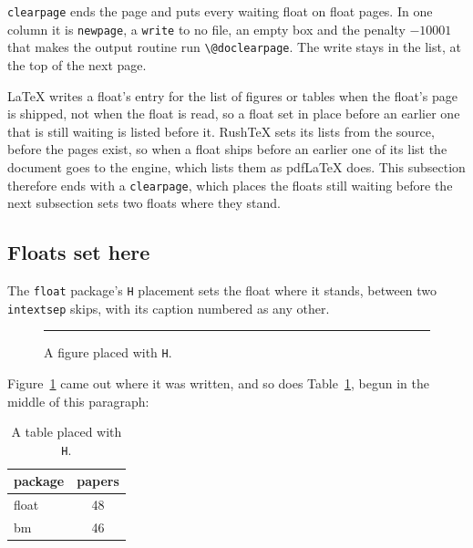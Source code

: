 \documentclass{article}
\numberwithin{equation}{section}
\theoremstyle{definition}
\theoremstyle{remark}
\begin{document}
\texttt{clearpage} ends the page and puts every waiting float on float pages. In one
column it is \texttt{newpage}, a \texttt{write} to no file, an empty box and the penalty
$-10001$ that makes the output routine run \texttt{\textbackslash @doclearpage}. The write stays in
the list, at the top of the next page.

\LaTeX{} writes a float's entry for the list of figures or tables when the float's page is
shipped, not when the float is read, so a float set in place before an earlier one that
is still waiting is listed before it. RushTeX sets its lists from the source, before the
pages exist, so when a float ships before an earlier one of its list the document goes to
the engine, which lists them as pdfLaTeX does. This subsection therefore ends with a
\texttt{clearpage}, which places the floats still waiting before the next subsection sets
two floats where they stand.
\clearpage

\subsection{Floats set here}
The \texttt{float} package's \texttt{H} placement sets the float where it stands, between
two \texttt{intextsep} skips, with its caption numbered as any other.
\begin{figure}[H]
  \centering
  \rule{4cm}{1.5cm}
  \caption{A figure placed with \texttt{H}.}\label{fig:here}
\end{figure}
Figure~\ref{fig:here} came out where it was written, and so does Table~\ref{tab:here}, begun
in the middle of this paragraph:
\begin{table}[H]
  \caption{A table placed with \texttt{H}.}\label{tab:here}
  \centering
  \begin{tabular}{lc}
    package & papers \\ \hline
    float & 48 \\
    bm & 46
  \end{tabular}
\end{table}
\end{document}

